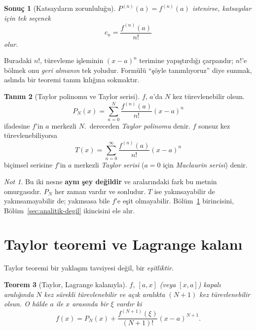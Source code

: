 \documentclass[11pt,a4paper]{article}
\theoremstyle{plain}
\newtheorem{teorem}{Teorem}[section]
\newtheorem{sonuc}[teorem]{Sonuç}
\theoremstyle{definition}
\newtheorem{tanim}[teorem]{Tanım}
\theoremstyle{remark}
\newtheorem*{notkutusu}{Not}
\begin{document}
\begin{sonuc}[Katsayıların zorunluluğu]
$P^{(n)}(a) = f^{(n)}(a)$ istenirse, katsayılar için \emph{tek} seçenek
\begin{equation}\label{eq:katsayi}
  c_n = \frac{f^{(n)}(a)}{n!}
\end{equation}
olur.
\end{sonuc}

Buradaki $n!$, türevleme işleminin $(x-a)^n$ terimine yapıştırdığı çarpandır;
$n!$'e bölmek onu \emph{geri almanın} tek yoludur. Formülü ``şöyle
tanımlıyoruz'' diye sunmak, aslında bir teoremi tanım kılığına sokmaktır.

\begin{tanim}[Taylor polinomu ve Taylor serisi]
$f$, $a$'da $N$ kez türevlenebilir olsun.
\[
  P_N(x) = \sum_{n=0}^{N} \frac{f^{(n)}(a)}{n!}(x-a)^n
\]
ifadesine $f$'in $a$ merkezli $N$.\ dereceden \emph{Taylor polinomu} denir.
$f$ sonsuz kez türevlenebiliyorsa
\[
  T(x) = \sum_{n=0}^{\infty} \frac{f^{(n)}(a)}{n!}(x-a)^n
\]
biçimsel serisine $f$'in $a$ merkezli \emph{Taylor serisi} ($a=0$ için
\emph{Maclaurin serisi}) denir.
\end{tanim}

\begin{notkutusu}
Bu iki nesne \textbf{aynı şey değildir} ve aralarındaki fark bu metnin
omurgasıdır. $P_N$ her zaman vardır ve sonludur. $T$ ise yakınsayabilir de
yakınsamayabilir de; yakınsasa bile $f$'e eşit olmayabilir. Bölüm~\ref{sec:kalan}
birincisini, Bölüm~\ref{sec:analitik-degil} ikincisini ele alır.
\end{notkutusu}

\section{Taylor teoremi ve Lagrange kalanı}\label{sec:kalan}

Taylor teoremi bir yaklaşım tavsiyesi değil, bir \emph{eşitliktir}.

\begin{teorem}[Taylor, Lagrange kalanıyla]\label{teorem:taylor}
$f$, $[a,x]$ (veya $[x,a]$) kapalı aralığında $N$ kez sürekli türevlenebilir
ve açık aralıkta $(N+1)$ kez türevlenebilir olsun. O hâlde $a$ ile $x$
\emph{arasında} bir $\xi$ vardır ki
\begin{equation}\label{eq:lagrange}
  f(x) = P_N(x) + \frac{f^{(N+1)}(\xi)}{(N+1)!}(x-a)^{N+1}.
\end{equation}
\end{teorem}
\end{document}
